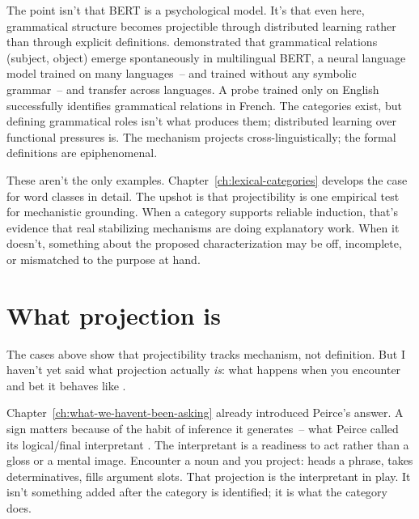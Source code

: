 The point isn't that BERT is a psychological model. It's that even here, grammatical structure becomes projectible through distributed learning rather than through explicit definitions. \textcite{chi2020} demonstrated that grammatical relations (subject, object) emerge spontaneously in multilingual BERT, a neural language model trained on many languages~-- and trained without any symbolic grammar~-- and transfer across languages. A probe trained only on English successfully identifies grammatical relations in French. The categories exist, but defining grammatical roles isn't what produces them; distributed learning over functional pressures is. The mechanism projects cross-linguistically; the formal definitions are epiphenomenal.

These aren't the only examples. Chapter~\ref{ch:lexical-categories} develops the case for word classes in detail. The upshot is that projectibility is one empirical test for mechanistic grounding. When a category supports reliable induction, that's evidence that real stabilizing mechanisms are doing explanatory work. When it doesn't, something about the proposed characterization may be off, incomplete, or mismatched to the purpose at hand.


\section{What projection is}
\label{sec:7:what-projection-is}

The cases above show that projectibility tracks mechanism, not definition. But I haven't yet said what projection actually \emph{is}: what happens when you encounter  and bet it behaves like .

Chapter~\ref{ch:what-we-havent-been-asking} already introduced Peirce's answer. A sign matters because of the habit of inference it generates~-- what Peirce called its logical/final interpretant \citep[CP~5.491]{peirce1931cp}. The interpretant is a readiness to act rather than a gloss or a mental image. Encounter a noun and you project: heads a phrase, takes determinatives, fills argument slots. That projection is the interpretant in play. It isn't something added after the category is identified; it is what the category does.

